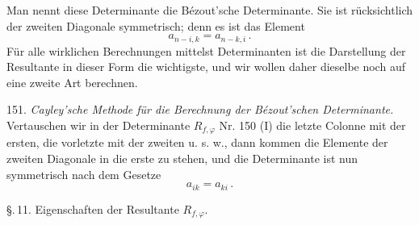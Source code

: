 \documentclass[11pt]{article}
\providecommand{\weberpage}[1]{}
\begin{document}
Man nennt diese Determinante die Bézout'sche Determinante. Sie ist rücksichtlich der zweiten Diagonale symmetrisch; denn es ist das Element
\[ a_{n-i,k} = a_{n-k,i}\,. \]
Für alle wirklichen Berechnungen mittelst Determinanten ist die Darstellung der Resultante in dieser Form die wichtigste, und wir wollen daher dieselbe noch auf eine zweite Art berechnen.

151. \textit{Cayley'sche Methode für die Berechnung der Bézout'schen Determinante.} Vertauschen wir in der Determinante $R_{f,\varphi}$ Nr. 150 (I) die letzte Colonne mit der ersten, die vorletzte mit der zweiten u. s. w., dann kommen die Elemente der zweiten Diagonale in die erste zu stehen, und die Determinante ist nun symmetrisch nach dem Gesetze
\[ a_{ik} = a_{ki}\,. \]


\weberpage{159}
\S.\,11. Eigenschaften der Resultante $R_{f,\varphi}$.
\end{document}
